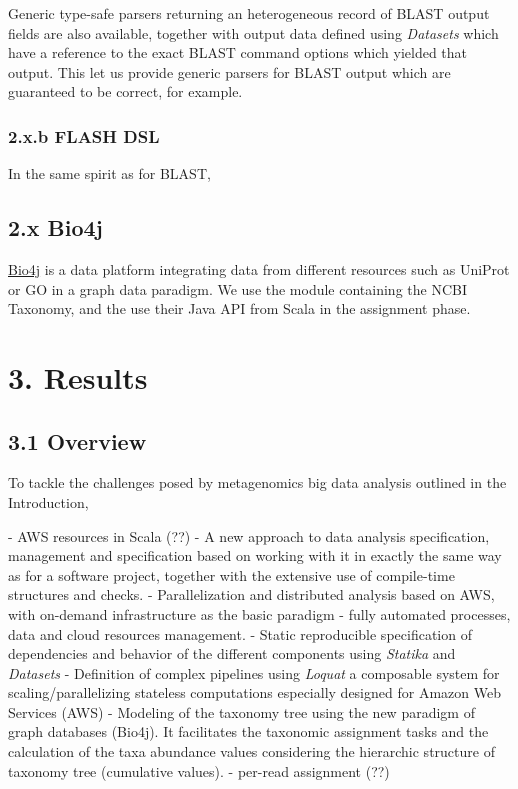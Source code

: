 \documentclass{frontiersSCNS} %
\begin{document}
Generic type-safe parsers returning an heterogeneous record of BLAST
output fields are also available, together with output data defined
using \emph{Datasets} which have a reference to the exact BLAST command
options which yielded that output. This let us provide generic parsers
for BLAST output which are guaranteed to be correct, for example.

\subsubsection{2.x.b FLASH DSL}\label{x.b-flash-dsl}

In the same spirit as for BLAST,

\subsection{2.x Bio4j}\label{x-bio4j}

\href{https://github.com/bio4j/bio4j}{Bio4j} is a data platform
integrating data from different resources such as UniProt or GO in a
graph data paradigm. We use the module containing the NCBI Taxonomy, and
the use their Java API from Scala in the assignment phase.

\section{3. Results}\label{results}

\subsection{3.1 Overview}\label{overview}

To tackle the challenges posed by metagenomics big data analysis
outlined in the Introduction,

­- AWS resources in Scala (??) - A new approach to data analysis
specification, management and specification based on working with it in
exactly the same way as for a software project, together with the
extensive use of compile-time structures and checks. - Parallelization
and distributed analysis based on AWS, with on-demand infrastructure as
the basic paradigm ­- fully automated processes, data and cloud
resources management. - Static reproducible specification of
dependencies and behavior of the different components using
\emph{Statika} and \emph{Datasets} - Definition of complex pipelines
using \emph{Loquat} a composable system for scaling/parallelizing
stateless computations especially designed for Amazon Web Services (AWS)
- Modeling of the taxonomy tree using the new paradigm of graph
databases (Bio4j). It facilitates the taxonomic assignment tasks and the
calculation of the taxa abundance values considering the hierarchic
structure of taxonomy tree (cumulative values). - per-read assignment
(??)
\end{document}
